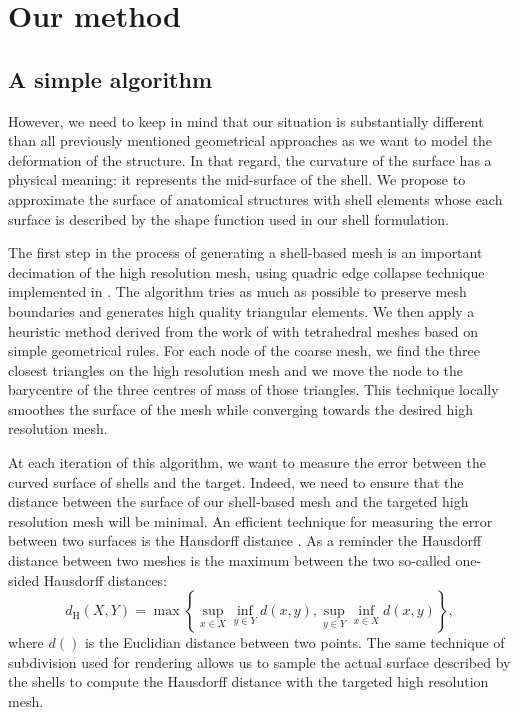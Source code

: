 \section{Our method}

	\subsection{A simple algorithm}
	
However, we need to keep in mind that our situation is substantially different than all previously mentioned geometrical approaches as we want to model the deformation of the structure. In that regard, the curvature of the surface has a physical meaning: it represents the mid-surface of the shell. We propose to approximate the surface of anatomical structures with shell elements whose each surface is described by the shape function used in our shell formulation.

The first step in the process of generating a shell-based mesh is an important decimation of the high resolution mesh, using quadric edge collapse technique implemented in \cite{Meshlab}. The algorithm tries as much as possible to preserve mesh boundaries and generates high quality triangular elements. We then apply a heuristic method derived from the work of \cite{Saupin07} with tetrahedral meshes based on simple geometrical rules. For each node of the coarse mesh, we find the three closest triangles on the high resolution mesh and we move the node to the barycentre of the three centres of mass of those triangles. This technique locally smoothes the surface of the mesh while converging towards the desired high resolution mesh. 

At each iteration of this algorithm, we want to measure the error between the curved surface of shells and the target. Indeed, we need to ensure that the distance between the surface of our shell-based mesh and the targeted high resolution mesh will be minimal. An efficient technique for measuring the error between two surfaces is the Hausdorff distance \citep{Klein96}. As a reminder the Hausdorff distance between two meshes is the maximum between the two so-called one-sided Hausdorff distances:
\begin{equation}
d_{\mathrm{H}}(X,Y) = \max \left\{ \sup_{x \in X} \inf_{y \in Y} d(x,y), \sup_{y \in Y} \inf_{x \in X} d(x,y) \right\},
\end{equation}
where $d()$ is the Euclidian distance between two points. The same technique of subdivision used for rendering allows us to sample the actual surface described by the shells to compute the Hausdorff distance with the targeted high resolution mesh. 

